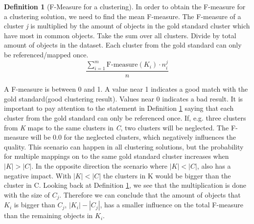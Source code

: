 \documentclass[a4paper,10pt]{article}
\theoremstyle{plain}
\theoremstyle{definition}
\newtheorem{defn}{Definition}
\begin{document}
\begin{defn}[F-Measure for a clustering]\label{def:mean F-measure}
	In order to obtain the F-measure for a clustering solution, we need to find the mean F-measure. The F-measure of a cluster \textit{j} is multiplied by the amount of objects in the gold standard cluster which have most in common objects. Take the sum over all clusters. Divide by total amount of objects in the dataset. Each cluster from the gold standard can only be referenced/mapped once.
	\begin{equation}
		\frac{\sum_{i = 1}^{m} \text{F-measure}(K_i) \cdot n_{i}^{j}}{n}
	\end{equation}
\end{defn}
A F-measure is between 0 and 1. A value near 1 indicates a good match with the gold standard(good clustering result). Values near 0 indicates a bad result. It is important to pay attention to the statement in Definition \ref{def:mean F-measure} saying that each cluster from the gold standard can only be referenced once. If, e.g. three clusters from \textit{K} maps to the same clusters in \textit{C}, two clusters will be neglected. The F-measure will be 0.0 for the neglected clusters, which negatively influences the quality. This scenario can happen in all clustering solutions, but the probability for multiple mappings on to the same gold standard cluster increases when $|K|>|C|$. In the opposite direction the scenario where $|K|<|C|$, also has a negative impact. With $|K|<|C|$ the clusters in K would be bigger than the cluster in C. 
Looking back at Definition \ref{def:mean F-measure}, we see that the multiplication is done with the size of $C_j$. Therefore we can conclude that the amount of objects that $K_i$ is bigger than $C_j$, $|K_i|-|C_j|$, has a smaller influence on the total F-measure than the remaining objects in $K_i$.


\end{document}
